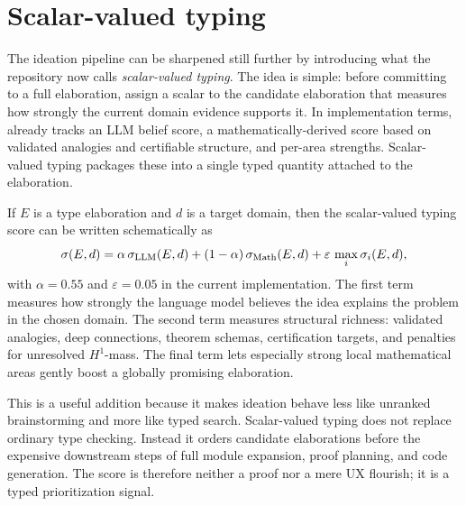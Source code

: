 \section*{Scalar-valued typing}
The ideation pipeline can be sharpened still further by introducing what the repository now
calls \emph{scalar-valued typing}. The idea is simple: before committing to a full
elaboration, assign a scalar to the candidate elaboration that measures how strongly the
current domain evidence supports it. In implementation terms,  already
tracks an LLM belief score, a mathematically-derived score based on validated analogies and
certifiable structure, and per-area strengths. Scalar-valued typing packages these into a
single typed quantity attached to the elaboration.

If $E$ is a type elaboration and $d$ is a target domain, then the scalar-valued typing
score can be written schematically as
\[
  \sigma(E,d) =
  \alpha \, \sigma_{\mathrm{LLM}}(E,d)
  + (1-\alpha)\, \sigma_{\mathrm{Math}}(E,d)
  + \varepsilon \, \max_i \sigma_i(E,d),
\]
with \(\alpha = 0.55\) and \(\varepsilon = 0.05\) in the current implementation. The
first term measures how strongly the language model believes the idea explains the problem
in the chosen domain. The second term measures structural richness: validated analogies,
deep connections, theorem schemas, certification targets, and penalties for unresolved
\(H^1\)-mass. The final term lets especially strong local mathematical areas gently boost a
globally promising elaboration.

This is a useful addition because it makes ideation behave less like unranked brainstorming
and more like typed search. Scalar-valued typing does not replace ordinary type checking.
Instead it orders candidate elaborations before the expensive downstream steps of full
module expansion, proof planning, and code generation. The score is therefore neither a
proof nor a mere UX flourish; it is a typed prioritization signal.


